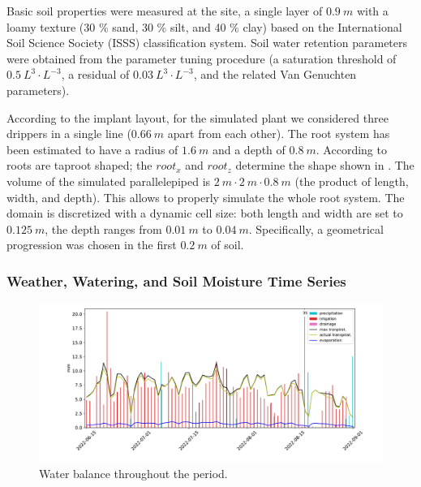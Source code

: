 Basic soil properties were measured at the site, a single layer of $0.9~m$ with a loamy texture (30 \% sand, 30 \% silt, and 40 \% clay) based on the International Soil Science Society (ISSS) classification system.
Soil water retention parameters were obtained from the parameter tuning procedure (a saturation threshold of $0.5~L^3 \cdot L^{-3}$, a residual of $0.03~L^3 \cdot L^{-3}$, and the related Van Genuchten parameters).

According to the implant layout, for the simulated plant we considered three drippers in a single line ($0.66~m$ apart from each other).
The root system has been estimated to have a radius of $1.6~m$ and a depth of $0.8~m$. According to  roots are taproot shaped; the $root_x$ and $root_z$ determine the shape shown in . The volume of the simulated parallelepiped is $2~m\cdot2~m\cdot0.8~m$ (the product of length, width, and depth).
This allows to properly simulate the whole root system.
The domain is discretized with a dynamic cell size: both length and width are set to $0.125~m$, the depth ranges from $0.01~m$ to $0.04~m$.
Specifically, a geometrical progression was chosen in the first $0.2~m$ of soil.


\subsubsection{Weather, Watering, and Soil Moisture Time Series}
\label{orchard-sec:time_series}

\begin{figure}[t]
    \centering
    \includegraphics[scale=.45]{chapters/physics-aware/orchard/img/water_balance.pdf}
    \caption{Water balance throughout the period.}
    \label{orchard-fig:water_balance}
\end{figure}

